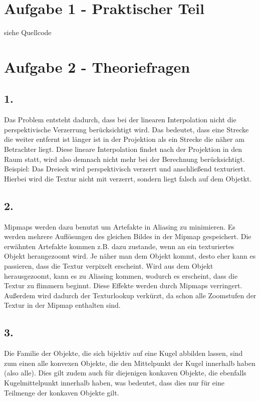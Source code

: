\documentclass[12pt]{scrreprt}
\begin{document}


\chapter*{Aufgabe 1 - Praktischer Teil}

siehe Quellcode

\chapter*{Aufgabe 2 - Theoriefragen}
\section*{1.}
Das Problem entsteht dadurch, dass bei der linearen Interpolation nicht die perspektivische Verzerrung berücksichtigt wird. Das bedeutet, dass eine Strecke die weiter entfernt ist länger ist in der Projektion als ein Strecke die näher am Betrachter liegt. 
Diese lineare Interpolation findet nach der Projektion in den Raum statt, wird also demnach nicht mehr bei der Berechnung berücksichtigt.
Beispiel: Das Dreieck wird perspektivisch verzerrt und anschließend texturiert. Hierbei wird die Textur nicht mit verzerrt, sondern liegt falsch auf dem Objetkt.
\section*{2.}
Mipmaps werden dazu benutzt um Artefakte in Aliasing zu minimieren. Es werden mehrere Auflösungen des gleichen Bildes in der Mipmap gespeichert. Die erwähnten Artefakte kommen z.B. dazu zustande, wenn an ein texturiertes Objekt herangezoomt wird. Je näher man dem Objekt kommt, desto eher kann es passieren, dass die Textur verpixelt erscheint. Wird aus dem Objekt herausgezoomt, kann es zu Aliasing kommen, wodurch es erscheint, dass die Textur zu flimmern beginnt. Diese Effekte werden durch Mipmaps verringert. Außerdem wird dadurch der Texturlookup verkürzt, da schon alle Zoomstufen der Textur in der Mipmap enthalten sind.
\section*{3.}
Die Familie der Objekte, die sich bijektiv auf eine Kugel abbilden lassen, sind zum einen alle konvexen Objekte, die den Mittelpunkt der Kugel innerhalb haben (also alle). Dies gilt zudem auch für diejenigen konkaven Objekte, die ebenfalls Kugelmittelpunkt innerhalb haben, was bedeutet, dass dies nur für eine Teilmenge der konkaven Objekte gilt.
\end{document}
